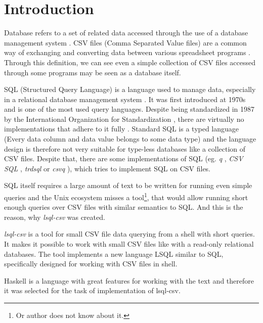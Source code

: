 \chapter*{Introduction}

Database refers to a set of related data accessed through the use of a database management system \cite{enwiki-database}.
CSV files (Comma Separated Value files) are a common way of exchanging and converting data between various spreadsheet programs \cite{rfc4180}.
Through this definition, we can see even a simple collection of CSV files accessed through some programs may be seen as a database itself.


SQL (Structured Query Language) is a language used to manage data, especially in a relational database management system \cite{enwiki-sql}.
It was first introduced at 1970s \cite{enwiki-sql} and is one of the most used query languages. 
Despite being standardized in 1987 by the International Organization for Standardization \cite{ISO9075-1987}, 
there are virtually no implementations that adhere to it fully \cite{enwiki-sql}.
Standard SQL is a typed language (Every data column and data value belongs to some data type) \cite{ISO9075-2023} and the language
design is therefore not very suitable for type-less databases like a collection of CSV files.
Despite that, there are some implementations of SQL (eg. \textit{q} \cite{q}, \textit{CSV SQL} \cite{csv-sql}, \textit{trdsql} \cite{trdsql} or \textit{csvq} \cite{csvq}), which tries to implement SQL on CSV files.

SQL itself requires a large amount of text to be written for running even simple queries and the Unix ecosystem misses a tool\footnote{Or author does not know about it.}, 
that would allow running short enough queries over CSV files with similar semantics to SQL. And this is the reason, why \textit{lsql-csv} was created.

\textit{lsql-csv} is a tool for small CSV file data querying from a shell with short queries. It makes it possible to work with small CSV files like with a read-only relational databases.
The tool implements a new language LSQL similar to SQL, specifically designed for working with CSV files in shell.

Haskell is a language with great features for working with the text \cite{practical-haskell} and therefore it was selected for the task of implementation of lsql-csv.
